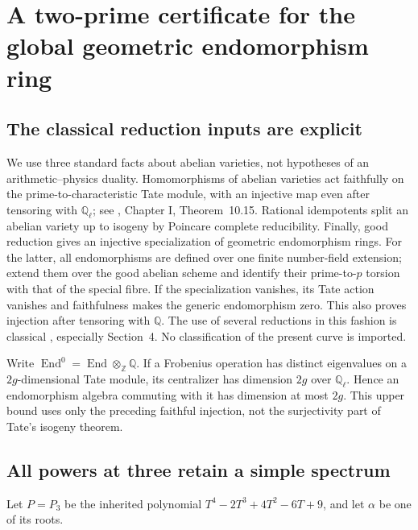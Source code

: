 \documentclass[11pt]{article}
\theoremstyle{definition}
\theoremstyle{remark}
\newcommand{\Q}{\mathbb Q}
\newcommand{\Z}{\mathbb Z}
\newcommand{\End}{\operatorname{End}}
\begin{document}
\section{A two-prime certificate for the global geometric endomorphism ring}
\label{sec:v6-End}

\subsection{The classical reduction inputs are explicit}
We use three standard facts about abelian varieties, not hypotheses of
an arithmetic--physics duality. Homomorphisms of abelian varieties act
faithfully on the prime-to-characteristic Tate module, with an injective
map even after tensoring with $\Q_\ell$; see \cite{MilneAV},
Chapter I, Theorem~10.15. Rational idempotents split an abelian variety
up to isogeny by Poincare complete reducibility. Finally, good reduction
gives an injective specialization of geometric endomorphism rings.
For the latter, all endomorphisms are defined over one finite number-field
extension; extend them over the good abelian scheme and identify their
prime-to-$p$ torsion with that of the special fibre. If the specialization
vanishes, its Tate action vanishes and faithfulness makes the generic
endomorphism zero. This also proves injection after tensoring with $\Q$.
The use of several reductions in this fashion is classical
\cite{LombardoEnd}, especially Section~4. No classification of the present
curve is imported.

Write $\End^0=\End\otimes_\Z\Q$. If a Frobenius operation has distinct
eigenvalues on a $2g$-dimensional Tate module, its centralizer has dimension
$2g$ over $\Q_\ell$. Hence an endomorphism algebra commuting with it has
dimension at most $2g$. This upper bound uses only the preceding faithful
injection, not the surjectivity part of Tate's isogeny theorem.

\subsection{All powers at three retain a simple spectrum}
Let $P=P_3$ be the inherited polynomial
$T^4-2T^3+4T^2-6T+9$, and let $\alpha$ be one of its roots.
\end{document}
